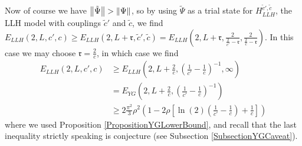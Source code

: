  Now of course we have $ \left\lVert \tilde{\Psi} \right\rVert>\left\lVert \Psi \right\rVert $, so by using $ \tilde{\Psi} $ as a trial state for $ H^{\tilde{c}',\tilde{c}}_{LLH} $, \ie the LLH model with couplings $ \tilde{c}' $ and $\tilde{c}$, we find $ E_{LLH}(2,L,c',c)\geq E_{LLH}(2,L+\mathfrak{r},\tilde{c}',\tilde{c})=E_{LLH}\left(2,L+\mathfrak{r},\frac{2}{\frac{2}{c'}-\mathfrak{r}},\frac{2}{\frac{2}{c}-\mathfrak{r}}\right) $. In this case we may choose $ \mathfrak{r}=\frac{2}{c} $, in which case we find \begin{equation}
 \begin{aligned}
 E_{LLH}(2,L,c',c)&\geq E_{LLH}\left(2,L+\frac{2}{c},\left(\frac{1}{c'}-\frac{1}{c}\right)^{-1},\infty\right)\\&=E_{YG}\left(2,L+\frac{2}{c},\left(\frac{1}{c'}-\frac{1}{c}\right)^{-1}\right)\\&\geq2\frac{\pi^2}{3}\rho^2\left(1-2\rho \left[\ln(2)\left(\frac{1}{c'}-\frac{1}{c}\right)+\frac{1}{c}\right]\right)
 \end{aligned}
 \end{equation}
 where we used Proposition \ref{PropositionYGLowerBound}, and recall that the last inequality strictly speaking is conjecture (see Subsection \ref{SubsectionYGCaveat}).

